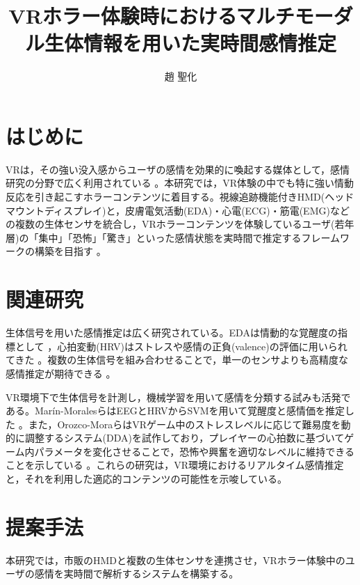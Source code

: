 \documentclass[paper=a4paper,fontsize=10pt,jafontscale=0.925,twocolumn]{jlreq}
\title{VRホラー体験時におけるマルチモーダル生体情報を用いた実時間感情推定} %
\affiliation{知能・機械工学課程 井村研究室} %
\author{趙 聖化} %
\begin{document}
\maketitle


\section{はじめに}

VRは，その強い没入感からユーザの感情を効果的に喚起する媒体として，感情研究の分野で広く利用されている 。本研究では，VR体験の中でも特に強い情動反応を引き起こすホラーコンテンツに着目する。視線追跡機能付きHMD(ヘッドマウントディスプレイ)と，皮膚電気活動(EDA)・心電(ECG)・筋電(EMG)などの複数の生体センサを統合し，VRホラーコンテンツを体験しているユーザ(若年層)の「集中」「恐怖」「驚き」といった感情状態を実時間で推定するフレームワークの構築を目指す 。

\section{関連研究}

生体信号を用いた感情推定は広く研究されている。EDAは情動的な覚醒度の指標として ，心拍変動(HRV)はストレスや感情の正負(valence)の評価に用いられてきた 。複数の生体信号を組み合わせることで，単一のセンサよりも高精度な感情推定が期待できる 。

VR環境下で生体信号を計測し，機械学習を用いて感情を分類する試みも活発である。Marín-MoralesらはEEGとHRVからSVMを用いて覚醒度と感情価を推定した 。また，Orozco-MoraらはVRゲーム中のストレスレベルに応じて難易度を動的に調整するシステム(DDA)を試作しており，プレイヤーの心拍数に基づいてゲーム内パラメータを変化させることで，恐怖や興奮を適切なレベルに維持できることを示している 。これらの研究は，VR環境におけるリアルタイム感情推定と，それを利用した適応的コンテンツの可能性を示唆している。

\section{提案手法}

本研究では，市販のHMDと複数の生体センサを連携させ，VRホラー体験中のユーザの感情を実時間で解析するシステムを構築する。
\end{document}
